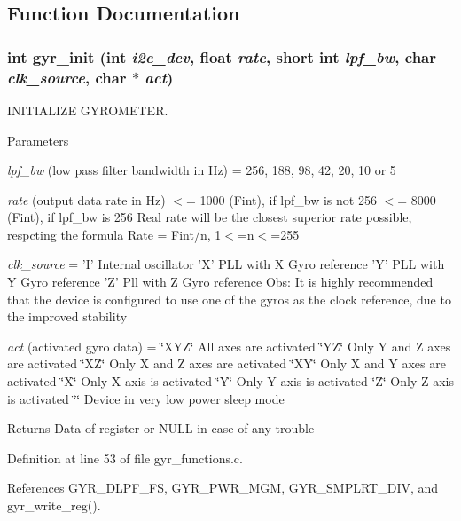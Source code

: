 \subsection{Function Documentation}
\hypertarget{group__gyr_ga6d02be352b4491a236c9695a6a24d174}{
\subsubsection[{gyr\_\-init}]{\setlength{\rightskip}{0pt plus 5cm}int gyr\_\-init (int {\em i2c\_\-dev}, \/  float {\em rate}, \/  short int {\em lpf\_\-bw}, \/  char {\em clk\_\-source}, \/  char $\ast$ {\em act})}}
\label{group__gyr_ga6d02be352b4491a236c9695a6a24d174}


INITIALIZE GYROMETER. 


\begin{DoxyParams}{Parameters}
\item[{\em lpf\_\-bw}](low pass filter bandwidth in Hz) = 256, 188, 98, 42, 20, 10 or 5 \item[{\em rate}](output data rate in Hz) $<$= 1000 (Fint), if lpf\_\-bw is not 256 $<$= 8000 (Fint), if lpf\_\-bw is 256 Real rate will be the closest superior rate possible, respcting the formula Rate = Fint/n, 1$<$=n$<$=255 \item[{\em clk\_\-source}]= 'I' Internal oscillator 'X' PLL with X Gyro reference 'Y' PLL with Y Gyro reference 'Z' Pll with Z Gyro reference Obs: It is highly recommended that the device is configured to use one of the gyros as the clock reference, due to the improved stability \item[{\em act}](activated gyro data) = \char`\"{}XYZ\char`\"{} All axes are activated \char`\"{}YZ\char`\"{} Only Y and Z axes are activated \char`\"{}XZ\char`\"{} Only X and Z axes are activated \char`\"{}XY\char`\"{} Only X and Y axes are activated \char`\"{}X\char`\"{} Only X axis is activated \char`\"{}Y\char`\"{} Only Y axis is activated \char`\"{}Z\char`\"{} Only Z axis is activated \char`\"{}\char`\"{} Device in very low power sleep mode \end{DoxyParams}
\begin{DoxyReturn}{Returns}
Data of register or NULL in case of any trouble 
\end{DoxyReturn}


Definition at line 53 of file gyr\_\-functions.c.



References GYR\_\-DLPF\_\-FS, GYR\_\-PWR\_\-MGM, GYR\_\-SMPLRT\_\-DIV, and gyr\_\-write\_\-reg().



